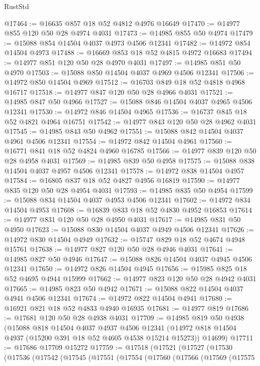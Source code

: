 \begin{lexlean}{RustStd}
\begin{coremodule}
@17464 := @16635 @857 @18 @52 @4812 @4976 @16649
@17470 := @14977 @855 @120 @50 @28 @4974 @4031
@17473 := @14985 @855 @50 @4974
@17479 := @15088 @854 @14504 @4037 @4973 @4506 @12341
@17482 := @14972 @854 @14504 @4973
@17488 := @16669 @853 @18 @52 @4815 @4972 @16683
@17494 := @14977 @851 @120 @50 @28 @4970 @4031
@17497 := @14985 @851 @50 @4970
@17503 := @15088 @850 @14504 @4037 @4969 @4506 @12341
@17506 := @14972 @850 @14504 @4969
@17512 := @16703 @849 @18 @52 @4818 @4968 @16717
@17518 := @14977 @847 @120 @50 @28 @4966 @4031
@17521 := @14985 @847 @50 @4966
@17527 := @15088 @846 @14504 @4037 @4965 @4506 @12341
@17530 := @14972 @846 @14504 @4965
@17536 := @16737 @845 @18 @52 @4821 @4964 @16751
@17542 := @14977 @843 @120 @50 @28 @4962 @4031
@17545 := @14985 @843 @50 @4962
@17551 := @15088 @842 @14504 @4037 @4961 @4506 @12341
@17554 := @14972 @842 @14504 @4961
@17560 := @16771 @841 @18 @52 @4824 @4960 @16785
@17566 := @14977 @839 @120 @50 @28 @4958 @4031
@17569 := @14985 @839 @50 @4958
@17575 := @15088 @838 @14504 @4037 @4957 @4506 @12341
@17578 := @14972 @838 @14504 @4957
@17584 := @16805 @837 @18 @52 @4827 @4956 @16819
@17590 := @14977 @835 @120 @50 @28 @4954 @4031
@17593 := @14985 @835 @50 @4954
@17599 := @15088 @834 @14504 @4037 @4953 @4506 @12341
@17602 := @14972 @834 @14504 @4953
@17608 := @16839 @833 @18 @52 @4830 @4952 @16853
@17614 := @14977 @831 @120 @50 @28 @4950 @4031
@17617 := @14985 @831 @50 @4950
@17623 := @15088 @830 @14504 @4037 @4949 @4506 @12341
@17626 := @14972 @830 @14504 @4949
@17632 := @15747 @829 @18 @52 @4674 @4948 @15761
@17638 := @14977 @827 @120 @50 @28 @4946 @4031
@17641 := @14985 @827 @50 @4946
@17647 := @15088 @826 @14504 @4037 @4945 @4506 @12341
@17650 := @14972 @826 @14504 @4945
@17656 := @15985 @825 @18 @52 @4695 @4944 @15999
@17662 := @14977 @823 @120 @50 @28 @4942 @4031
@17665 := @14985 @823 @50 @4942
@17671 := @15088 @822 @14504 @4037 @4941 @4506 @12341
@17674 := @14972 @822 @14504 @4941
@17680 := @16921 @821 @18 @52 @4833 @4940 @16935
@17681 := @14977 @819
@17686 := @17681 @120 @50 @28 @4938 @4031
@17709 := @14985
    @819
    @50
    @4938
    (@15088
      @818
      @14504
      @4037
      @4937
      @4506
      @12341
      (@14972 @818 @14504 @4937 (@15200 @391 @18 @52 @4605 @4538 @15214 @15273))
      @14699)
@17711 := @17686 @17709 @15272
@17759 := @17518
    (@17521
      (@17527
        (@17530
          (@17536
            (@17542
              (@17545
                (@17551
                  (@17554
                    (@17560
                      (@17566
                        (@17569
                          (@17575

\end{coremodule}
\end{lexlean}
